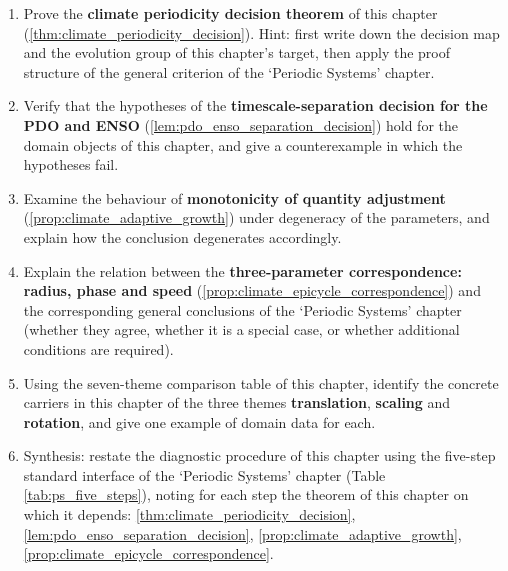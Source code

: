 \begin{enumerate}[leftmargin=3em, label=\textbf{Exercise \arabic*}]
    \item Prove the \textbf{climate periodicity decision theorem} of this chapter (\ref{thm:climate_periodicity_decision}). Hint: first write down the decision map and the evolution group of this chapter's target, then apply the proof structure of the general criterion of the `Periodic Systems' chapter.

    \item Verify that the hypotheses of the \textbf{timescale-separation decision for the PDO and ENSO} (\ref{lem:pdo_enso_separation_decision}) hold for the domain objects of this chapter, and give a counterexample in which the hypotheses fail.

    \item Examine the behaviour of \textbf{monotonicity of quantity adjustment} (\ref{prop:climate_adaptive_growth}) under degeneracy of the parameters, and explain how the conclusion degenerates accordingly.

    \item Explain the relation between the \textbf{three-parameter correspondence: radius, phase and speed} (\ref{prop:climate_epicycle_correspondence}) and the corresponding general conclusions of the `Periodic Systems' chapter (whether they agree, whether it is a special case, or whether additional conditions are required).

    \item Using the seven-theme comparison table of this chapter, identify the concrete carriers in this chapter of the three themes \textbf{translation}, \textbf{scaling} and \textbf{rotation}, and give one example of domain data for each.

    \item Synthesis: restate the diagnostic procedure of this chapter using the five-step standard interface of the `Periodic Systems' chapter (Table \ref{tab:ps_five_steps}), noting for each step the theorem of this chapter on which it depends: \ref{thm:climate_periodicity_decision}, \ref{lem:pdo_enso_separation_decision}, \ref{prop:climate_adaptive_growth}, \ref{prop:climate_epicycle_correspondence}.
\end{enumerate}


